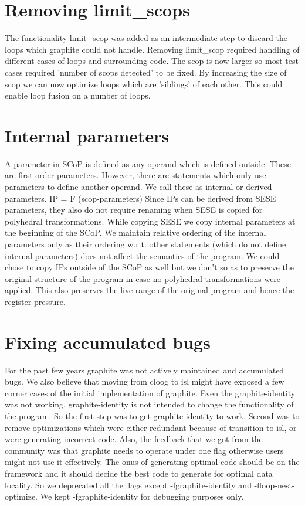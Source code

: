 \section{Removing limit_scops}
The functionality limit_scop was added
as an intermediate step to discard the loops which graphite could not
handle. Removing limit_scop required handling of different cases of loops and
surrounding code.  The scop is now larger so most test cases required 'number of
scops detected' to be fixed. By increasing the size of scop we can now optimize
loops which are 'siblings' of each other. This could enable loop fusion on a
number of loops.



\section{Internal parameters}
A parameter in SCoP is defined as any operand which is defined outside. These are first order parameters.
However, there are statements which only use parameters to define another operand. We call these as internal or
derived parameters.
IP = F (scop-parameters)
Since IPs can be derived from SESE parameters, they also do not require renaming when SESE is copied for polyhedral
transformations. While copying SESE we copy internal parameters at the beginning of the SCoP.
We maintain relative ordering of the internal parameters only as their ordering w.r.t. other
statements (which do not define internal parameters) does not affect the semantics of the program.
We could chose to copy IPs outside of the SCoP as well but we don't so as to preserve the original structure of the
program in case no polyhedral transformations were applied. This also preserves the live-range
of the original program and hence the register pressure.


\section{Fixing accumulated bugs}
For the past few years graphite was not actively maintained and accumulated bugs. We also believe that
moving from cloog to isl might have exposed a few corner cases of the initial implementation of graphite.
Even the graphite-identity was not working. graphite-identity is not intended to change the functionality
of the program. So the first step was to get graphite-identity to work. Second was to remove optimizations which
were either redundant because of transition to isl, or were generating incorrect code. Also, the feedback that we
got from the community was that graphite needs to operate under one flag otherwise users might not use it effectively.
The onus of generating optimal code should be on the framework and it should decide the best code to generate
for optimal data locality. So we deprecated all the flags except -fgraphite-identity and -floop-nest-optimize.
We kept -fgraphite-identity for debugging purposes only.

